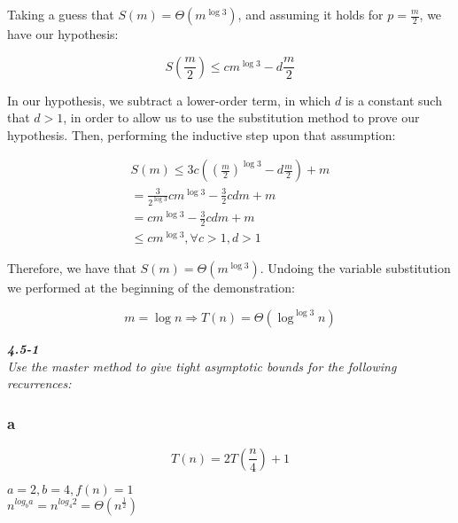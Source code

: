 \documentclass[8pt,a4paper]{article}
\begin{document}
  Taking a guess that $S(m) = \Theta(m^{\log 3})$, and assuming it holds for $p = \frac{m}{2}$, we have
our hypothesis:

\begin{equation*}
  S\left(\frac{m}{2}\right) \leq cm^{\log 3} - d\frac{m}{2}
\end{equation*}

  In our hypothesis, we subtract a lower-order term, in which $d$ is a constant such that $d > 1$, in
order to allow us to use the substitution method to prove our hypothesis. Then, performing the
inductive step upon that assumption:

\begin{equation*}
  \begin{split}
    S(m) \leq 3c\left(\left(\frac{m}{2}\right)^{\log 3} - d\frac{m}{2}\right) + m \\
    = \frac{3}{2^{\log 3}}cm^{\log 3} - \frac{3}{2} cdm + m \\
    = cm^{\log 3} - \frac{3}{2} cdm + m \\
    \leq cm^{\log 3}, \forall c > 1, d > 1
  \end{split}
\end{equation*}

  Therefore, we have that $S(m) = \Theta(m^{\log 3})$. Undoing the variable substitution we performed
at the beginning of the demonstration:

\begin{equation*}
  m = \log n \Rightarrow T(n) = \Theta(\log^{\log 3} n)
\end{equation*}

\begin{framed}
\textbf{\textit{4.5-1}} \\
\textit{Use the master method to give tight asymptotic bounds for the following recurrences:}
\end{framed}

\subsubsection*{a}

\begin{equation*}
  T(n) = 2T\left(\frac{n}{4}\right) + 1
\end{equation*}

$a = 2, b = 4, f(n) = 1$ \\

$n^{log_{b} a} = n^{log_{4} 2} = \Theta(n^{\frac{1}{2}})$ \\
\end{document}
